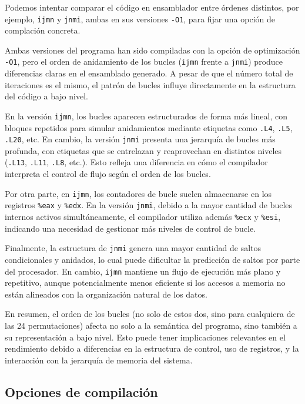 \documentclass[11pt,a4paper,twoside]{article}
\theoremstyle{definition}
\begin{document}
	Podemos intentar comparar el código en ensamblador entre órdenes distintos, por ejemplo, \texttt{ijmn} y \texttt{jnmi}, ambas en sus versiones \texttt{-O1}, para fijar una opción de complación concreta.
	
	Ambas versiones del programa han sido compiladas con la opción de optimización \texttt{-O1}, pero el orden de anidamiento de los bucles (\texttt{ijmn} frente a \texttt{jnmi}) produce diferencias claras en el ensamblado generado. A pesar de que el número total de iteraciones es el mismo, el patrón de bucles influye directamente en la estructura del código a bajo nivel.
	
	En la versión \texttt{ijmn}, los bucles aparecen estructurados de forma más lineal, con bloques repetidos para simular anidamientos mediante etiquetas como \texttt{.L4}, \texttt{.L5}, \texttt{.L20}, etc. En cambio, la versión \texttt{jnmi} presenta una jerarquía de bucles más profunda, con etiquetas que se entrelazan y reaprovechan en distintos niveles (\texttt{.L13}, \texttt{.L11}, \texttt{.L8}, etc.). Esto refleja una diferencia en cómo el compilador interpreta el control de flujo según el orden de los bucles.
		
	Por otra parte, en \texttt{ijmn}, los contadores de bucle suelen almacenarse en los registros \texttt{\%eax} y \texttt{\%edx}. En la versión \texttt{jnmi}, debido a la mayor cantidad de bucles internos activos simultáneamente, el compilador utiliza además \texttt{\%ecx} y \texttt{\%esi}, indicando una necesidad de gestionar más niveles de control de bucle.
		
	Finalmente, la estructura de \texttt{jnmi} genera una mayor cantidad de saltos condicionales y anidados, lo cual puede dificultar la predicción de saltos por parte del procesador. En cambio, \texttt{ijmn} mantiene un flujo de ejecución más plano y repetitivo, aunque potencialmente menos eficiente si los accesos a memoria no están alineados con la organización natural de los datos.
	
	En resumen, el orden de los bucles (no solo de estos dos, sino para cualquiera de las 24 permutaciones) afecta no solo a la semántica del programa, sino también a su representación a bajo nivel. Esto puede tener implicaciones relevantes en el rendimiento debido a diferencias en la estructura de control, uso de registros, y la interacción con la jerarquía de memoria del sistema.
	
	
	\subsection{Opciones de compilación}
	
\end{document}
